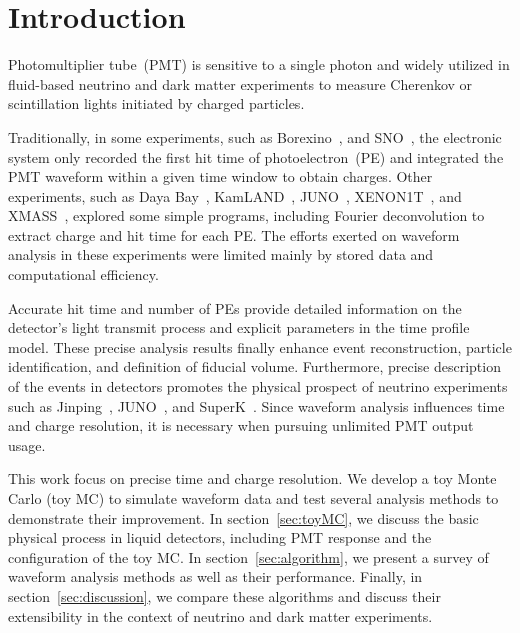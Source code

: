 \section{Introduction}
\label{sec:introduction}

Photomultiplier tube~(PMT) is sensitive to a single photon and widely utilized in fluid-based neutrino and dark matter experiments to measure Cherenkov or scintillation lights initiated by charged particles.

Traditionally, in some experiments, such as Borexino~\cite{lagomarsino_gateless_1999}, and SNO~\cite{dunger_event_2019}, the electronic system only recorded the first hit time of photoelectron~(PE) and integrated the PMT waveform within a given time window to obtain charges. Other experiments, such as Daya Bay~\cite{huang_flash_2018}, KamLAND~\cite{the_kamland_collaboration_production_2010}, JUNO~\cite{zhang_comparison_2019}, XENON1T~\cite{aprile_xenon1t_2019}, and XMASS~\cite{abe_xmass_2013}, explored some simple programs, including Fourier deconvolution to extract charge and hit time for each PE. The efforts exerted on waveform analysis in these experiments were limited mainly by stored data and computational efficiency. 

Accurate hit time and number of PEs provide detailed information on the detector's light transmit process and explicit parameters in the time profile model. These precise analysis results finally enhance event reconstruction, particle identification, and definition of fiducial volume. Furthermore, precise description of the events in detectors promotes the physical prospect of neutrino experiments such as Jinping~\cite{beacom_physics_2017}, JUNO~\cite{an_neutrino_2016}, and SuperK~\cite{noauthor_super-kamiokande_2003}. Since waveform analysis influences time and charge resolution, it is necessary when pursuing unlimited PMT output usage. 

This work focus on precise time and charge resolution. We develop a toy Monte Carlo (toy MC) to simulate waveform data and test several analysis methods to demonstrate their improvement. In section~\ref{sec:toyMC}, we discuss the basic physical process in liquid detectors, including PMT response and the configuration of the toy MC. In section~\ref{sec:algorithm}, we present a survey of waveform analysis methods as well as their performance. Finally, in section~\ref{sec:discussion}, we compare these algorithms and discuss their extensibility in the context of neutrino and dark matter experiments. 
